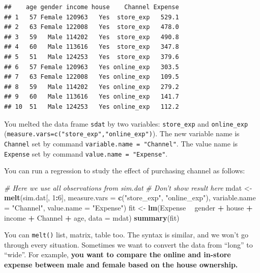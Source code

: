 \documentclass[12pt,]{krantz}
\makeatletter
\newenvironment{Shaded}{\begin{snugshade}}{\end{snugshade}}
\newcommand{\CommentTok}[1]{\textcolor[rgb]{0.37,0.37,0.37}{\textit{#1}}}
\newcommand{\DataTypeTok}[1]{\textcolor[rgb]{0.27,0.27,0.27}{#1}}
\newcommand{\DecValTok}[1]{\textcolor[rgb]{0.06,0.06,0.06}{#1}}
\newcommand{\KeywordTok}[1]{\textcolor[rgb]{0.27,0.27,0.27}{\textbf{#1}}}
\newcommand{\NormalTok}[1]{#1}
\newcommand{\OperatorTok}[1]{\textcolor[rgb]{0.43,0.43,0.43}{\textbf{#1}}}
\newcommand{\StringTok}[1]{\textcolor[rgb]{0.5,0.5,0.5}{#1}}
\newenvironment{kframe}{%
\medskip{}
\setlength{\fboxsep}{.8em}
 \def\at@end@of@kframe{}%
 \ifinner\ifhmode%
  \def\at@end@of@kframe{\end{minipage}}%
  \begin{minipage}{\columnwidth}%
 \fi\fi%
 \def\FrameCommand##1{\hskip\@totalleftmargin \hskip-\fboxsep
 \colorbox{shadecolor}{##1}\hskip-\fboxsep
     \hskip-\linewidth \hskip-\@totalleftmargin \hskip\columnwidth}%
 \MakeFramed {\advance\hsize-\width
   \@totalleftmargin\z@ \linewidth\hsize
   \@setminipage}}%
 {\par\unskip\endMakeFramed%
 \at@end@of@kframe}
\renewenvironment{Shaded}{\begin{kframe}}{\end{kframe}}
\makeatother
\begin{document}
\begin{verbatim}
##    age gender income house    Channel Expense
## 1   57 Female 120963   Yes  store_exp   529.1
## 2   63 Female 122008   Yes  store_exp   478.0
## 3   59   Male 114202   Yes  store_exp   490.8
## 4   60   Male 113616   Yes  store_exp   347.8
## 5   51   Male 124253   Yes  store_exp   379.6
## 6   57 Female 120963   Yes online_exp   303.5
## 7   63 Female 122008   Yes online_exp   109.5
## 8   59   Male 114202   Yes online_exp   279.2
## 9   60   Male 113616   Yes online_exp   141.7
## 10  51   Male 124253   Yes online_exp   112.2
\end{verbatim}

You melted the data frame \texttt{sdat} by two variables: \texttt{store\_exp} and \texttt{online\_exp} (\texttt{measure.vars=c("store\_exp","online\_exp")}). The new variable name is \texttt{Channel} set by command \texttt{variable.name\ =\ "Channel"}. The value name is \texttt{Expense} set by command \texttt{value.name\ =\ "Expense"}.

You can run a regression to study the effect of purchasing channel as follows:

\begin{Shaded}
\begin{Highlighting}[]
\CommentTok{# Here we use all observations from sim.dat}
\CommentTok{# Don't show result here}
\NormalTok{mdat <-}\StringTok{ }\KeywordTok{melt}\NormalTok{(sim.dat[, }\DecValTok{1}\OperatorTok{:}\DecValTok{6}\NormalTok{], }\DataTypeTok{measure.vars =} \KeywordTok{c}\NormalTok{(}\StringTok{"store_exp"}\NormalTok{, }\StringTok{"online_exp"}\NormalTok{), }
    \DataTypeTok{variable.name =} \StringTok{"Channel"}\NormalTok{, }\DataTypeTok{value.name =} \StringTok{"Expense"}\NormalTok{)}
\NormalTok{fit <-}\StringTok{ }\KeywordTok{lm}\NormalTok{(Expense }\OperatorTok{~}\StringTok{ }\NormalTok{gender }\OperatorTok{+}\StringTok{ }\NormalTok{house }\OperatorTok{+}\StringTok{ }\NormalTok{income }\OperatorTok{+}\StringTok{ }\NormalTok{Channel }\OperatorTok{+}\StringTok{ }\NormalTok{age, }\DataTypeTok{data =}\NormalTok{ mdat)}
\KeywordTok{summary}\NormalTok{(fit)}
\end{Highlighting}
\end{Shaded}

You can \texttt{melt()} list, matrix, table too. The syntax is similar, and we won't go through every situation. Sometimes we want to convert the data from ``long'' to ``wide''. For example, \textbf{you want to compare the online and in-store expense between male and female based on the house ownership. }
\end{document}
